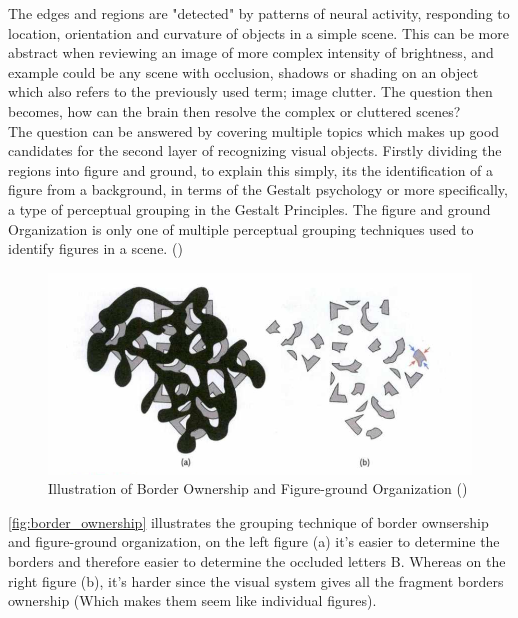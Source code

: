 \documentclass{article}
\newcommand{\goodcite}[1]{ {(\cite{#1})}}
\begin{document}
The edges and regions are "detected" by patterns of neural activity, responding to location, orientation and curvature of objects in a simple scene. This can be more abstract when reviewing an image of more complex intensity of brightness, and example could be any scene with occlusion, shadows or shading on an object which also refers to the previously used term; image clutter. The question then becomes, how can the brain then resolve the complex or cluttered scenes?\\

The question can be answered by covering multiple topics which makes up good candidates for the second layer of recognizing visual objects. Firstly dividing the regions into figure and ground, to explain this simply, its the identification of a figure from a background, in terms of the Gestalt psychology or more specifically, a type of perceptual grouping in the Gestalt Principles. The figure and ground Organization is only one of multiple perceptual grouping techniques used to identify figures in a scene.\goodcite{hsp}\\

\begin{figure}[H]
    \centering
    \includegraphics[width=\textwidth]{img/b.png}
    \caption{Illustration of Border Ownership and Figure-ground Organization\goodcite{hsp}}
    \label{fig:border_ownership}
\end{figure}

\autoref{fig:border_ownership} illustrates the grouping technique of border ownsership and figure-ground organization, on the left figure (a) it's easier to determine the borders and therefore easier to determine the occluded letters B. Whereas on the right figure (b), it's harder since the visual system gives all the fragment borders ownership (Which makes them seem like individual figures).\medskip \\
\end{document}
